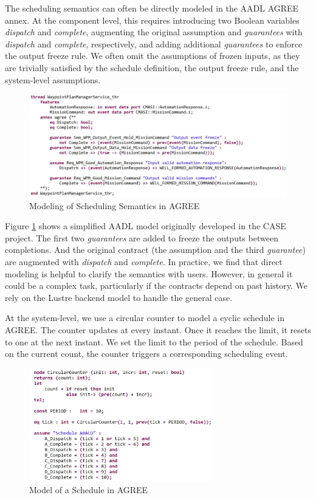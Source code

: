 The scheduling semantics can often be directly modeled in the AADL AGREE annex. At the component level, this requires introducing two Boolean variables \emph{dispatch} and \emph{complete}, augmenting the original assumption and \emph{guarantees} with \emph{dispatch} and \emph{complete}, respectively, and adding additional \emph{guarantees} to enforce the output freeze rule. We often omit the assumptions of frozen inputs, as they are trivially satisfied by the schedule definition, the output freeze rule, and the system-level assumptions.

\begin{figure}[ht!]
\centering
\includegraphics[width=130mm]{wpmAGREE3.jpg}
\caption{Modeling of Scheduling Semantics in AGREE\label{wpmAGREE}}
\end{figure}

Figure \ref{wpmAGREE} shows a simplified AADL model originally developed in the CASE project. The first two \emph{guarantees} are added to freeze the outputs between completions. And the original contract (the assumption and the third \emph{guarantee}) are augmented with \emph{dispatch} and \emph{complete}.
In practice, we find that direct modeling is helpful to clarify the semantics with users. However, in general it could be a complex task, particularly if the contracts depend on past history. We rely on the Lustre backend model to handle the general case.

At the system-level, we use a circular counter to model a cyclic schedule in AGREE. 
The counter updates at every instant. Once it reaches the limit, it resets to one at the next instant.
We set the limit to the period of the schedule. 
Based on the current count, the counter triggers a corresponding scheduling event.

\begin{figure}[ht!]
\centering
\includegraphics[width=80mm]{schedule.jpg}
\caption{Model of a Schedule in AGREE\label{schedule}}
\end{figure}

